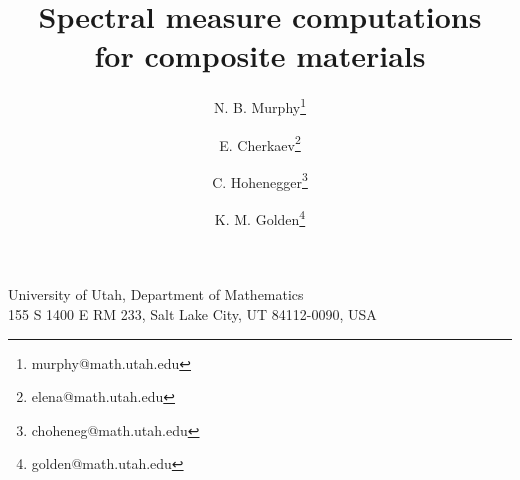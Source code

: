 \documentclass{cmslatex}
\begin{document}
\title{Spectral measure computations \\ for composite materials}
%
\author{N. B. Murphy\thanks {murphy@math.utah.edu}
%
\and E. Cherkaev\thanks {elena@math.utah.edu}
%
\and C. Hohenegger\thanks {choheneg@math.utah.edu}
%
\and K. M. Golden\thanks {golden@math.utah.edu}
}



\pagestyle{myheadings} \maketitle


\begin{center}
University of Utah, Department of Mathematics \\ 155 S 1400 E
  RM 233, Salt Lake City, UT 84112-0090, USA
\end{center}

\vspace{3ex}
\end{document}
